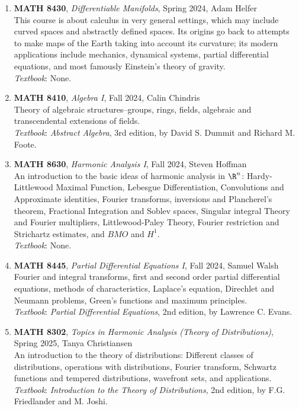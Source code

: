 \documentclass{article}
\begin{document}
\begin{enumerate}[leftmargin=*]
    \item[] \textbf{MATH 8430}, \textit{Differentiable Manifolds}, Spring 2024, Adam Helfer\\
    This course is about calculus in very general settings, which may include curved spaces and abstractly defined spaces. Its origins go back to attempts to make maps of the Earth taking into account its curvature; its modern applications include mechanics, dynamical systems, partial differential equations, and most famously Einstein's theory of gravity. \\
    \textit{Textbook}: None. 

    \item[] \textbf{MATH 8410}, \textit{Algebra I}, Fall 2024, Calin Chindris\\
    Theory of algebraic structures--groups, rings, fields, algebraic and transcendental extensions of fields. \\
    \textit{Textbook}: \textit{Abstract Algebra}, 3rd edition, by David S. Dummit and Richard M. Foote. 

    \newpage
    
    \item[] \textbf{MATH 8630}, \textit{Harmonic Analysis I}, Fall 2024, Steven Hoffman \\
    An introduction to the basic ideas of harmonic analysis in $\R^n$: Hardy-Littlewood Maximal Function, Lebesgue Differentiation, Convolutions and Approximate identities, Fourier transforms, inversions and Plancherel's theorem, Fractional Integration and Soblev spaces, Singular integral Theory and Fourier multipliers, Littlewood-Paley Theory, Fourier restriction and Strichartz estimates, and $BMO$ and $H^1$.\\
    \textit{Textbook}: None.  

    \item[] \textbf{MATH 8445}, \textit{Partial Differential Equations I}, Fall 2024, Samuel Walsh\\
    Fourier and integral transforms, first and second order partial differential equations, methods of characteristics, Laplace's equation, Direchlet and Neumann problems, Green's functions and maximum principles. \\
    \textit{Textbook}: \textit{Partial Differential Equations}, 2nd edition, by Lawrence C. Evans. 

    \item[] \textbf{MATH 8302}, \textit{Topics in Harmonic Analysis (Theory of Distributions)}, Spring 2025, Tanya Christiansen\\
    An introduction to the theory of distributions: Different classes of distributions, operations with distributions, Fourier transform, Schwartz functions and tempered distributions, wavefront sets, and applications. \\
    \textit{Textbook}: \textit{Introduction to the Theory of Distributions}, 2nd edition, by F.G. Friedlander and M. Joshi.
    

\end{enumerate}
\end{document}
